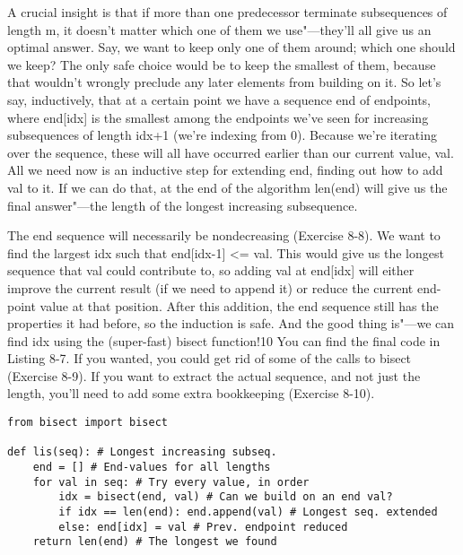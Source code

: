 A crucial insight is that if more than one predecessor terminate subsequences of length m, it doesn't matter which one of them we use"---they'll all give us an optimal answer. Say, we want to keep only one of them around; which one should we keep? The only safe choice would be to keep the smallest of them, because that wouldn't wrongly preclude any later elements from building on it. So let's say, inductively, that at a certain point we have a sequence end of endpoints, where end[idx] is the smallest among the endpoints we've seen for increasing subsequences of length idx+1 (we're indexing from 0). Because we're iterating over the sequence, these will all have occurred earlier than our current value, val. All we need now is an inductive step for extending end, finding out how to add val to it. If we can do that, at the end of the algorithm len(end) will give us the final answer"---the length of the longest increasing subsequence.

The end sequence will necessarily be nondecreasing (Exercise 8-8). We want to find the largest idx
such that end[idx-1] <= val. This would give us the longest sequence that val could contribute to, so adding val at end[idx] will either improve the current result (if we need to append it) or reduce the current end-point value at that position. After this addition, the end sequence still has the properties it had before, so the induction is safe. And the good thing is"---we can find idx using the (super-fast) bisect function!10 You can find the final code in Listing 8-7. If you wanted, you could get rid of some of the calls to bisect (Exercise 8-9). If you want to extract the actual sequence, and not just the length, you'll need to add some extra bookkeeping (Exercise 8-10).

\begin{lstlisting}
from bisect import bisect

def lis(seq): # Longest increasing subseq.
    end = [] # End-values for all lengths
    for val in seq: # Try every value, in order
        idx = bisect(end, val) # Can we build on an end val?
        if idx == len(end): end.append(val) # Longest seq. extended
        else: end[idx] = val # Prev. endpoint reduced
    return len(end) # The longest we found
\end{lstlisting}

